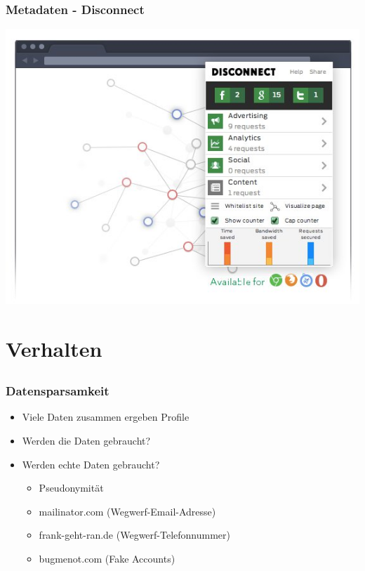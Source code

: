 \documentclass[12pt]{beamer}
\begin{document}
\begin{frame}
  \frametitle{Metadaten - Disconnect}
  \begin{center}
	\includegraphics[height=0.7\textheight]{img/disconnectme.jpg}
  \end{center}
\end{frame}

\section{Verhalten}
\subsection{}

\begin{frame}
    \frametitle{Datensparsamkeit}
    \begin{itemize}
        \item<2-> Viele Daten zusammen ergeben Profile
        \item<3-> Werden die Daten gebraucht?
        \item<4-> Werden echte Daten gebraucht?
            \begin{itemize}
              \item<5-> Pseudonymität
              \item<6-> mailinator.com (Wegwerf-Email-Adresse)
              \item<7-> frank-geht-ran.de (Wegwerf-Telefonnummer)
              \item<8-> bugmenot.com (Fake Accounts)
            \end{itemize}
    \end{itemize}
\end{frame}
\end{document}
